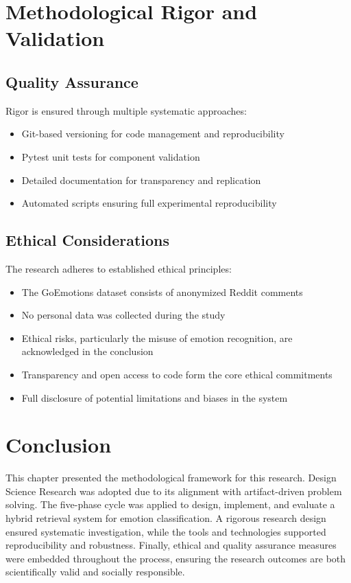 \section{Methodological Rigor and Validation}
\label{sec:quality}
\subsection{Quality Assurance}
Rigor is ensured through multiple systematic approaches:
\begin{itemize}
    \item Git-based versioning for code management and reproducibility
    \item Pytest unit tests for component validation
    \item Detailed documentation for transparency and replication
    \item Automated scripts ensuring full experimental reproducibility
\end{itemize}

\subsection{Ethical Considerations}
The research adheres to established ethical principles:
\begin{itemize}
    \item The GoEmotions dataset consists of anonymized Reddit comments \cite{demszky2020goemotions}
    \item No personal data was collected during the study
    \item Ethical risks, particularly the misuse of emotion recognition, are acknowledged in the conclusion
    \item Transparency and open access to code form the core ethical commitments
    \item Full disclosure of potential limitations and biases in the system
\end{itemize}
\section{Conclusion}
\label{sec:summary}
This chapter presented the methodological framework for this research. Design Science Research was adopted due to its alignment with artifact-driven problem solving. The five-phase cycle was applied to design, implement, and evaluate a hybrid retrieval system for emotion classification. A rigorous research design ensured systematic investigation, while the tools and technologies supported reproducibility and robustness. Finally, ethical and quality assurance measures were embedded throughout the process, ensuring the research outcomes are both scientifically valid and socially responsible.
